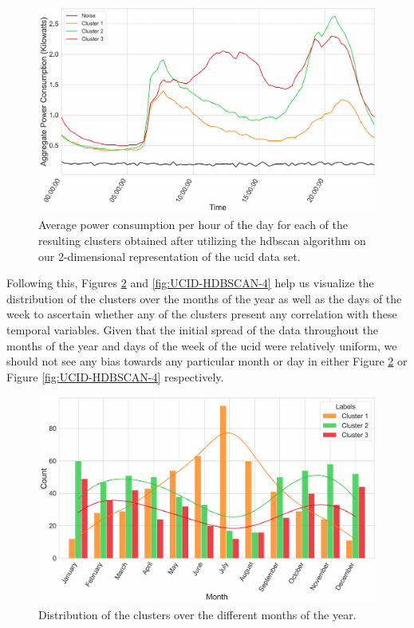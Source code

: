 \begin{adjustwidth}{-1.65cm}{-0.0cm}
\begin{enumerate}[label=Step 2.\arabic*:, leftmargin=*]
        \begin{figure}[hbt!]
            \centering
            \includegraphics[width=\textwidth]{Images/Chapter 5/Stage 2/UCID/UCID-HDBSCAN-2.pdf}
            \caption{Average power consumption per hour of the day for each of the resulting clusters obtained after utilizing the \gls{hdbscan} algorithm on our 2-dimensional representation of the \gls{ucid} data set.}
            \label{fig:UCID-HDBSCAN-2}
        \end{figure}
        
        \noindent \newline Following this, Figures \ref{fig:UCID-HDBSCAN-3} and \ref{fig:UCID-HDBSCAN-4} help us visualize the distribution of the clusters over the months of the year as well as the days of the week to ascertain whether any of the clusters present any correlation with these temporal variables. Given that the initial spread of the data throughout the months of the year and days of the week of the \gls{ucid} were relatively uniform, we should not see any bias towards any particular month or day in either Figure \ref{fig:UCID-HDBSCAN-3} or Figure \ref{fig:UCID-HDBSCAN-4} respectively.
        
        \begin{figure}[H]
            \centering
            \includegraphics[width=\textwidth]{Images/Chapter 5/Stage 2/UCID/UCID-HDBSCAN-3.pdf}
            \caption{Distribution of the clusters over the different months of the year.}
            \label{fig:UCID-HDBSCAN-3}
        \end{figure}
        

\end{enumerate}
\end{adjustwidth}
